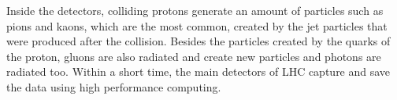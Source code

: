 	

Inside the detectors, colliding protons generate an amount of particles such as pions and kaons, which are the most common, created by the jet particles that were produced after the collision. Besides the particles created by the quarks of the proton, gluons are also radiated and create new particles and photons are radiated too. 
Within a short time, the main detectors of LHC capture 
and save the data using high performance computing. 


